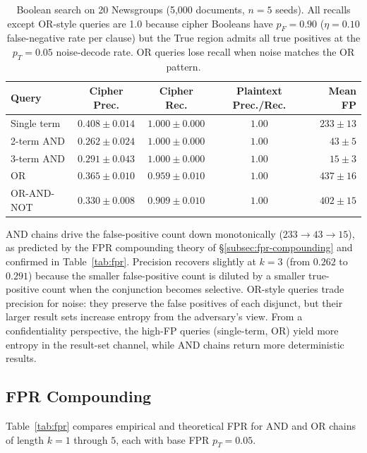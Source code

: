 \documentclass[11pt]{article}
\theoremstyle{definition}
\theoremstyle{plain}
\theoremstyle{remark}
\begin{document}
\begin{table}[ht]
\centering
\caption{Boolean search on 20 Newsgroups (5,000 documents, $n=5$
seeds).  All recalls except OR-style queries are 1.0 because cipher
Booleans have $p_F = 0.90$ ($\eta = 0.10$ false-negative rate per
clause) but the True region admits all true positives at the
$p_T = 0.05$ noise-decode rate.  OR queries lose recall when noise
matches the OR pattern.}
\label{tab:boolean}
\begin{tabular}{@{}lcccr@{}}
\toprule
Query & Cipher Prec. & Cipher Rec. & Plaintext Prec./Rec. & Mean FP \\
\midrule
Single term  & $0.408 \pm 0.014$ & $1.000 \pm 0.000$ & $1.00$ & $233 \pm 13$ \\
2-term AND   & $0.262 \pm 0.024$ & $1.000 \pm 0.000$ & $1.00$ & $43 \pm 5$ \\
3-term AND   & $0.291 \pm 0.043$ & $1.000 \pm 0.000$ & $1.00$ & $15 \pm 3$ \\
OR           & $0.365 \pm 0.010$ & $0.959 \pm 0.010$ & $1.00$ & $437 \pm 16$ \\
OR-AND-NOT   & $0.330 \pm 0.008$ & $0.909 \pm 0.010$ & $1.00$ & $402 \pm 15$ \\
\bottomrule
\end{tabular}
\end{table}

AND chains drive the false-positive count down monotonically
($233 \to 43 \to 15$), as predicted by the FPR compounding theory of
\S\ref{subsec:fpr-compounding} and confirmed in
Table~\ref{tab:fpr}.  Precision recovers slightly at $k=3$ (from
$0.262$ to $0.291$) because the smaller false-positive count is
diluted by a smaller true-positive count when the conjunction
becomes selective.  OR-style queries trade precision for noise:
they preserve the false positives of each disjunct, but their
larger result sets increase entropy from the adversary's view.
From a confidentiality perspective, the high-FP queries
(single-term, OR) yield more entropy in the result-set channel,
while AND chains return more deterministic results.

\subsection{FPR Compounding}

Table~\ref{tab:fpr} compares empirical and theoretical FPR for AND and
OR chains of length $k = 1$ through $5$, each with base FPR
$p_T = 0.05$.
\end{document}
